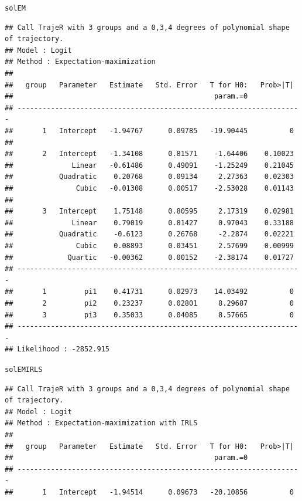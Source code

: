 \documentclass{article}\usepackage[]{graphicx}\usepackage[]{color}
\makeatletter
\newcommand{\hlstd}[1]{\textcolor[rgb]{0.345,0.345,0.345}{#1}}%
\newenvironment{kframe}{%
 \def\at@end@of@kframe{}%
 \ifinner\ifhmode%
  \def\at@end@of@kframe{\end{minipage}}%
  \begin{minipage}{\columnwidth}%
 \fi\fi%
 \def\FrameCommand##1{\hskip\@totalleftmargin \hskip-\fboxsep
 \colorbox{shadecolor}{##1}\hskip-\fboxsep
     \hskip-\linewidth \hskip-\@totalleftmargin \hskip\columnwidth}%
 \MakeFramed {\advance\hsize-\width
   \@totalleftmargin\z@ \linewidth\hsize
   \@setminipage}}%
 {\par\unskip\endMakeFramed%
 \at@end@of@kframe}
\newenvironment{knitrout}{}{} %
\makeatother
\begin{document}
\begin{knitrout}
\color{fgcolor}\begin{kframe}
\begin{alltt}
\hlstd{solEM}
\end{alltt}
\begin{verbatim}
## Call TrajeR with 3 groups and a 0,3,4 degrees of polynomial shape of trajectory.
## Model : Logit
## Method : Expectation-maximization 
##  
##   group   Parameter   Estimate   Std. Error   T for H0:   Prob>|T|  
##                                                param.=0             
## --------------------------------------------------------------------
##       1   Intercept   -1.94767      0.09785   -19.90445          0  
##                                                                     
##       2   Intercept   -1.34108      0.81571    -1.64406    0.10023  
##              Linear   -0.61486      0.49091    -1.25249    0.21045  
##           Quadratic    0.20768      0.09134     2.27363    0.02303  
##               Cubic   -0.01308      0.00517    -2.53028    0.01143  
##                                                                     
##       3   Intercept    1.75148      0.80595     2.17319    0.02981  
##              Linear    0.79019      0.81427     0.97043    0.33188  
##           Quadratic    -0.6123      0.26768     -2.2874    0.02221  
##               Cubic    0.08893      0.03451     2.57699    0.00999  
##             Quartic   -0.00362      0.00152    -2.38174    0.01727  
## --------------------------------------------------------------------
##       1         pi1    0.41731      0.02973    14.03492          0  
##       2         pi2    0.23237      0.02801     8.29687          0  
##       3         pi3    0.35033      0.04085     8.57665          0  
## --------------------------------------------------------------------
## Likelihood : -2852.915
\end{verbatim}
\begin{alltt}
\hlstd{solEMIRLS}
\end{alltt}
\begin{verbatim}
## Call TrajeR with 3 groups and a 0,3,4 degrees of polynomial shape of trajectory.
## Model : Logit
## Method : Expectation-maximization with IRLS
##  
##   group   Parameter   Estimate   Std. Error   T for H0:   Prob>|T|  
##                                                param.=0             
## --------------------------------------------------------------------
##       1   Intercept   -1.94514      0.09673   -20.10856          0  

\end{verbatim}
\end{kframe}
\end{knitrout}
\end{document}
